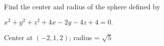 {Find the center and radius of the sphere defined by

$x^2+y^2+z^2+4x-2y-4z+4=0.$
}
{Center at $(-2,1,2)$; radius = $\sqrt{5}$
}
